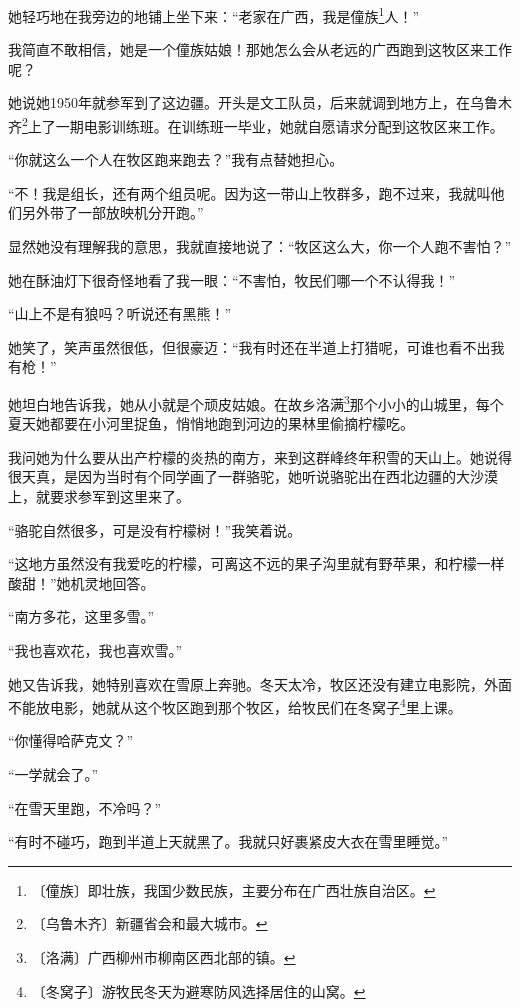 \documentclass[12pt,UTF-8,openany]{ctexbook}
\begin{document}
\begin{Large}
    她轻巧地在我旁边的地铺上坐下来：“老家在广西，我是僮族\footnote{〔僮族〕即壮族，我国少数民族，主要分布在广西壮族自治区。}人！”
    
    我简直不敢相信，她是一个僮族姑娘！那她怎么会从老远的广西跑到这牧区来工作呢？
    
    她说她1950年就参军到了这边疆。开头是文工队员，后来就调到地方上，在乌鲁木齐\footnote{〔乌鲁木齐〕新疆省会和最大城市。}上了一期电影训练班。在训练班一毕业，她就自愿请求分配到这牧区来工作。
    
    “你就这么一个人在牧区跑来跑去？”我有点替她担心。
    
    “不！我是组长，还有两个组员呢。因为这一带山上牧群多，跑不过来，我就叫他们另外带了一部放映机分开跑。”
    
    显然她没有理解我的意思，我就直接地说了：“牧区这么大，你一个人跑不害怕？”
    
    她在酥油灯下很奇怪地看了我一眼：“不害怕，牧民们哪一个不认得我！”
    
    “山上不是有狼吗？听说还有黑熊！”
    
    她笑了，笑声虽然很低，但很豪迈：“我有时还在半道上打猎呢，可谁也看不出我有枪！”
    
    她坦白地告诉我，她从小就是个顽皮姑娘。在故乡洛满\footnote{〔洛满〕广西柳州市柳南区西北部的镇。}那个小小的山城里，每个夏天她都要在小河里捉鱼，悄悄地跑到河边的果林里偷摘柠檬吃。
    
    我问她为什么要从出产柠檬的炎热的南方，来到这群峰终年积雪的天山上。她说得很天真，是因为当时有个同学画了一群骆驼，她听说骆驼出在西北边疆的大沙漠上，就要求参军到这里来了。
    
    “骆驼自然很多，可是没有柠檬树！”我笑着说。
    
    “这地方虽然没有我爱吃的柠檬，可离这不远的果子沟里就有野苹果，和柠檬一样酸甜！”她机灵地回答。
    
    “南方多花，这里多雪。”
    
    “我也喜欢花，我也喜欢雪。”
    
    她又告诉我，她特别喜欢在雪原上奔驰。冬天太冷，牧区还没有建立电影院，外面不能放电影，她就从这个牧区跑到那个牧区，给牧民们在冬窝子\footnote{〔冬窝子〕游牧民冬天为避寒防风选择居住的山窝。}里上课。
    
    “你懂得哈萨克文？”
    
    “一学就会了。”
    
    “在雪天里跑，不冷吗？”
    
    “有时不碰巧，跑到半道上天就黑了。我就只好裹紧皮大衣在雪里睡觉。”
    

\end{Large}
\end{document}
